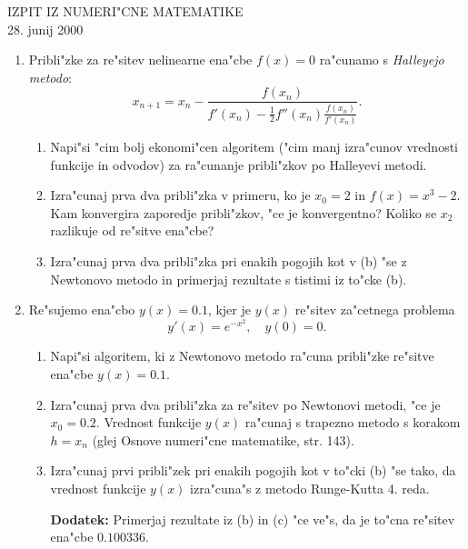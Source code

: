 \documentclass[12pt,a4paper]{article}
\begin{document}
\begin{center}
  {\Large {IZPIT IZ NUMERI"CNE MATEMATIKE}}\\
   28. junij 2000
\end{center}

\vspace{1cm}

\begin{enumerate}

  \item Pribli"zke za re"sitev nelinearne ena"cbe $f(x)=0$ 
  ra"cunamo  s {\sl Halleyejo metodo}:
  $$x_{n+1}=x_n-\frac{f(x_n)}{f'(x_n)-\frac{1}{2}f''(x_n)
  \frac{f(x_n)}{f'(x_n)}}.$$

  \begin{enumerate}
   
   \item Napi"si "cim bolj ekonomi"cen algoritem ("cim manj izra"cunov 
   vrednosti funkcije in odvodov) za ra"cunanje
   pribli"zkov po Halleyevi metodi.

   \item Izra"cunaj prva dva pribli"zka v primeru, ko je
   $x_0=2$ in $f(x)=x^3-2$. Kam konvergira zaporedje pribli"zkov,
   "ce je konvergentno? Koliko se $x_2$ razlikuje od re"sitve 
    ena"cbe?
    

   \item Izra"cunaj prva dva pribli"zka pri enakih pogojih kot v (b)
   "se z Newtonovo metodo in primerjaj rezultate s tistimi iz to"cke (b).

  \end{enumerate}
 
  \item Re"sujemo ena"cbo $y(x)=0.1$, kjer je $y(x)$
  re"sitev za"cetnega problema 
  $$y'(x)=e^{-x^2},\quad y(0)=0.$$

\begin{enumerate}
  \item Napi"si algoritem, ki z Newtonovo metodo ra"cuna 
  pribli"zke re"sitve ena"cbe $y(x)=0.1$.

  \item Izra"cunaj prva dva pribli"zka za re"sitev po Newtonovi 
  metodi, "ce je $x_0=0.2$. Vrednost funkcije $y(x)$ 
  ra"cunaj s trapezno metodo s korakom $h=x_n$ (glej Osnove numeri"cne
  matematike, str. 143).
  
  \item Izra"cunaj prvi pribli"zek pri enakih pogojih kot
  v to"cki (b) "se tako, da vrednost funkcije $y(x)$ 
  izra"cuna"s z metodo Runge-Kutta 4. reda.

  \item[\bf{Dodatek}:] Primerjaj rezultate iz (b) in (c) "ce ve"s, da je 
  to"cna re"sitev ena"cbe $0.100336$.
\end{enumerate}
  

\end{enumerate}
\end{document}

